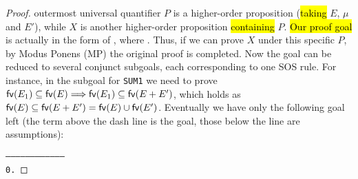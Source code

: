 \begin{proof}
outermost universal quantifier $P$ is a higher-order
proposition (\hl{taking} $E$, $\mu$ and $E'$), while $X$ is another higher-order
proposition \hl{containing} $P$.
\hl{Our proof goal} is actually in the form of
, where
. Thus, if we can prove
$X$ under this specific $P$, by Modus Ponens (MP) the original proof
is completed.
Now the goal can be reduced to several conjunct
subgoals, each corresponding to one SOS rule. For instance, in
the subgoal for \texttt{SUM1} we need to prove
${{\rm\sf{fv}}}(E_1) \subseteq {{\rm\sf{fv}}}(E) \Longrightarrow
{{\rm\sf{fv}}}(E_1) \subseteq {{\rm\sf{fv}}}(E + E')$, which holds as ${{\rm\sf{fv}}}(E)
\subseteq {{\rm\sf{fv}}}(E + E') = {{\rm\sf{fv}}}(E) \cup {{\rm\sf{fv}}}(E')$. Eventually we have only
the following goal left (the term above the dash line is the goal,
those below the line are assumptions):
\begin{alltt}
   ------------------------------------
    0.  

\end{alltt}
\end{proof}
